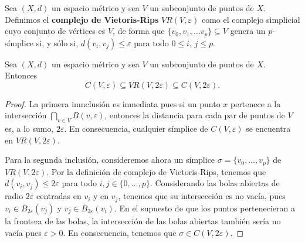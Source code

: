 \begin{definicion}
	Sea \((X,d)\) un espacio métrico y sea \(V\) un subconjunto de puntos de \(X\). Definimos el \textbf{complejo de Vietoris-Rips} \(VR(V,\varepsilon)\) como el complejo simplicial cuyo conjunto de vértices es \(V\), de forma que \(\{v_0, v_1, \dots v_p\} \subseteq V\) genera un \(p\)-símplice si, y sólo si, \(d(v_i,v_j) \leq \varepsilon\) para todo \(0 \leq i\), \(j \leq p\).
\end{definicion}
\begin{proposicion}
	Sea \((X,d)\) un espacio métrico y sea \(V\) un subconjunto de puntos de \(X\). Entonces
	\[
		C(V, \varepsilon) \subseteq VR(V, 2\varepsilon) \subseteq C(V, 2\varepsilon).
	\]
\end{proposicion}
\begin{proof}
	La primera imnclusión es inmediata pues si un punto \(x\) pertenece a la intersección \(\bigcap_{v \in V} B(v, \varepsilon)\), entonces la distancia para cada par de puntos de \(V\) es, a lo sumo, \(2 \varepsilon\). En consecuencia, cualquier símplice de \(C(V,\varepsilon)\) se encuentra en \(VR(V, 2\varepsilon)\).
	
	Para la segunda inclusión, consideremos ahora un símplice \(\sigma = \{v_0, \dots, v_p\}\) de \(VR(V, 2\varepsilon)\). Por la definición de complejo de Vietoris-Rips, tenemos que \(d(v_i, v_j) \leq 2\varepsilon\) para todo \(i,j \in \{0, \dots, p\}\). Considerando las bolas abiertas de radio \(2\varepsilon\) centradas en \(v_i\) y en \(v_j\), tenemos que su intersección es no vacía, pues \(v_i \in \overline{B}_{2\varepsilon}(v_j)\) y \(v_j \in \overline{B}_{2\varepsilon}(v_i)\). En el supuesto de que los puntos pertenecieran a la frontera de las bolas, la intersección de las bolas abiertas también sería no vacía pues \(\varepsilon > 0\). En consecuencia, tenemos que \(\sigma \in C(V,2\varepsilon)\).
\end{proof}


